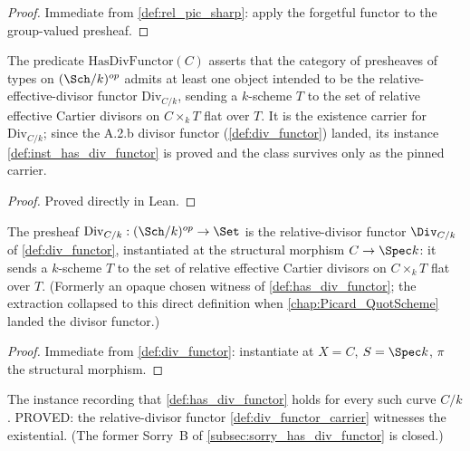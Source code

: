 \begin{proof}\leanok
  Immediate from \cref{def:rel_pic_sharp}: apply the forgetful functor to
  the group-valued presheaf.
\end{proof}

\begin{definition}
  \label{def:has_div_functor}
  The predicate \(\mathrm{HasDivFunctor}(C)\) asserts that the category of presheaves
  of types on \((\Sch/k)^{op}\) admits at least one object intended to be the
  relative-effective-divisor functor \(\mathrm{Div}_{C/k}\), sending a
  \(k\)-scheme \(T\) to the set of relative effective Cartier divisors on
  \(C \times_k T\) flat over \(T\). It is the existence carrier for
  \(\mathrm{Div}_{C/k}\); since the A.2.b divisor functor
  (\cref{def:div_functor}) landed, its instance
  \cref{def:inst_has_div_functor} is proved and the class survives only as
  the pinned carrier.
\end{definition}

\begin{proof}
  Proved directly in Lean.
\end{proof}

\begin{definition}
  \label{def:div_functor_carrier}
  The presheaf \(\mathrm{Div}_{C/k} : (\Sch/k)^{op} \to \Set\) is the
  relative-divisor functor \(\Div_{C/k}\) of \cref{def:div_functor},
  instantiated at the structural morphism \(C \to \Spec k\): it sends a
  \(k\)-scheme \(T\) to the set of relative effective Cartier divisors on
  \(C \times_k T\) flat over \(T\).  (Formerly an opaque chosen witness of
  \cref{def:has_div_functor}; the extraction collapsed to this direct
  definition when \cref{chap:Picard_QuotScheme} landed the divisor functor.)
\end{definition}

\begin{proof}\leanok
  Immediate from \cref{def:div_functor}: instantiate at
  \(X = C\), \(S = \Spec k\), \(\pi\) the structural morphism.
\end{proof}

\begin{definition}
  \label{def:inst_has_div_functor}
  The instance recording that \cref{def:has_div_functor} holds for every
  such curve \(C/k\).  PROVED: the relative-divisor functor
  \cref{def:div_functor_carrier} witnesses the existential.  (The former
  Sorry~B of \cref{subsec:sorry_has_div_functor} is closed.)
\end{definition}


